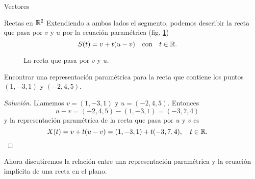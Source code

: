 \begin{chapter}{Vectores}
\begin{section}{Rectas en $\mathbb R^2$}
        Extendiendo a ambos lados el segmento, podemos describir la recta que pasa por $v$ y $u$ por la ecuación paramétrica (fig. \ref{fig-recta-entre-puntos})
        \begin{equation*}
        S(t) = v + t(u-v)\quad  \text{con}\quad t \in \mathbb R.
        \end{equation*}
        \begin{figure}[h]
        	\centering
            \caption{La recta que pasa por $v$ y $u$.}
            \label{fig-recta-entre-puntos}
        \end{figure} 
        
        \begin{ejemplo*}
            Encontrar una representación paramétrica para la recta que contiene los puntos $(1, - 3, 1)$ y $(- 2,4,5)$.
        \end{ejemplo*}	
        \begin{proof}[Solución] Llamemos $v = (1, - 3, 1)$ y $u =(- 2,4,5)$. Entonces $$u-v = (- 2,4,5) - (1,-3,1) = (-3,7,4)$$ y la representación paramétrica de la recta que pasa por $u$ y $v$  es 
        \begin{equation*}
            X (t) = v + t(u-v) = (1, -3,1) + t (-3, 7, 4),\quad t\in \mathbb R.
        \end{equation*}
        \end{proof}
    
        Ahora discutiremos la relación entre una representación paramétrica y la ecuación implícita de una recta en el plano.
        

\end{section}
\end{chapter}

